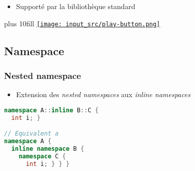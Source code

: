 \documentclass[C++.tex]{subfiles}
\begin{document}
\begin{frame}[fragile]
\begin{itemize}
		\item Supporté par la bibliothèque standard
	\end{itemize}

	\vskip 10mm plus 10fill
	\hfill
	\href{https://godbolt.org/#g:!((g:!((g:!((h:codeEditor,i:(filename:'1',fontScale:14,fontUsePx:'0',j:1,lang:c%2B%2B,selection:(endColumn:1,endLineNumber:37,positionColumn:1,positionLineNumber:37,selectionStartColumn:1,selectionStartLineNumber:37,startColumn:1,startLineNumber:37),source:'%23include+%3Ccompare%3E%0A%23include+%3Ciostream%3E%0A%0Astruct+Foo%0A%7B%0A++int+value%3B%0A%0A%23if+1%0A++auto+operator%3C%3D%3E(const+Foo%26+rhs)+const%0A++%7B%0A++++return+value+%3C%3D%3E+rhs.value%3B%0A++%7D%0A%23endif%0A%0A%23if+0%0A++bool+operator%3D%3D(const+Foo%26+rhs)+const+%3D+default%3B%0A%23endif%0A%0A%23if+0%0A++auto+operator%3C%3D%3E(const+Foo%26+rhs)+const+%3D+default%3B%0A%23endif%0A%7D%3B%0A%0Aint+main()%0A%7B%0A++Foo+foo1%7B2011%7D%3B%0A++Foo+foo2%7B2014%7D%3B%0A%0A++std::cout+%3C%3C+std::boolalpha%3B%0A++std::cout+%3C%3C+(foo1+%3C+foo2)+%3C%3C+%22%5Cn%22%3B%0A++std::cout+%3C%3C+(foo1+%3E+foo2)+%3C%3C+%22%5Cn%22%3B%0A%23if+0%0A++std::cout+%3C%3C+(foo1+%3D%3D+foo2)+%3C%3C+%22%5Cn%22%3B%0A++std::cout+%3C%3C+(foo1+!!%3D+foo2)+%3C%3C+%22%5Cn%22%3B%0A%23endif%0A%7D%0A'),l:'5',n:'0',o:'C%2B%2B+source+%231',t:'0')),k:50,l:'4',n:'0',o:'',s:0,t:'0'),(g:!((h:executor,i:(argsPanelShown:'1',compilationPanelShown:'0',compiler:g112,compilerOutShown:'0',execArgs:'',execStdin:'',fontScale:14,fontUsePx:'0',j:1,lang:c%2B%2B,libs:!((name:boost,ver:'175')),options:'-std%3Dc%2B%2B20',source:1,stdinPanelShown:'1',tree:'1',wrap:'0'),l:'5',n:'0',o:'Executor+x86-64+gcc+11.2+(C%2B%2B,+Editor+%231)',t:'0')),header:(),k:50,l:'4',n:'0',o:'',s:0,t:'0')),l:'2',n:'0',o:'',t:'0')),version:4}{\texttt{[image: input\_src/play-button.png]}}
\end{frame}

\subsection*{Namespace}
\begin{frame}[fragile]
	\frametitle{Nested namespace}
	\begin{itemize}
		\item Extension des \textit{nested namespaces} aux \textit{inline namespaces}
	\end{itemize}

	\begin{lstlisting}[language=C++]
namespace A::inline B::C { 
  int i; }

// Equivalent a
namespace A {
  inline namespace B {
    namespace C {
      int i; } } }\end{lstlisting}

\end{frame}
\end{document}

